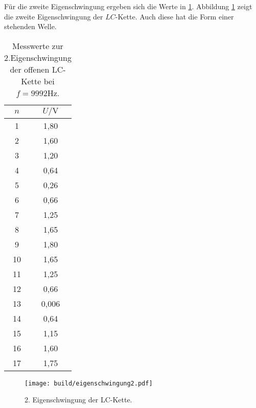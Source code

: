 Für die zweite Eigenschwingung ergeben sich die Werte in \ref{tab:eigenschwingung2}. Abbildung \ref{fig:eigenschwingung2} zeigt die zweite Eigenschwingung der $LC$-Kette. Auch diese hat die Form einer stehenden Welle.

\begin{table}
  \centering
  \caption{Messwerte zur 2.Eigenschwingung der offenen LC-Kette bei $f = 9992 \si{\Hz}$.}
  \label{tab:eigenschwingung2}
  \begin{tabular}{c c}
    \toprule
    $n$ & $U / \si{\volt}$ \\
\midrule
1 & 1,80 \\
2 & 1,60 \\
3 & 1,20 \\
4 & 0,64 \\
5 & 0,26 \\
6 & 0,66 \\
7 & 1,25 \\
8 & 1,65 \\
9 & 1,80 \\
10 & 1,65 \\
11 & 1,25 \\
12 & 0,66 \\
13 & 0,006 \\
14 & 0,64 \\
15 & 1,15 \\
16 & 1,60 \\
17 & 1,75 \\
\bottomrule
\end{tabular}
\end{table}

\begin{figure}
  \centering
  \texttt{[image: build/eigenschwingung2.pdf]}
\caption{2. Eigenschwingung der LC-Kette.}
  \label{fig:eigenschwingung2}
\end{figure}

